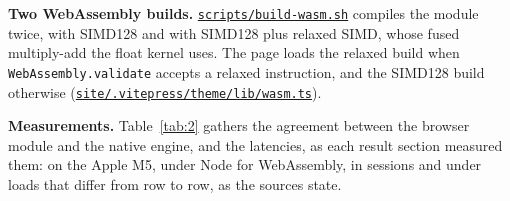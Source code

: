 \documentclass[10pt]{article}
\begin{document}
\textbf{Two WebAssembly builds.} \href{https://github.com/maxgfr/skycmd/blob/main/scripts/build-wasm.sh}{\texttt{scripts/\allowbreak{}build-wasm.sh}} compiles the module twice, with SIMD128 and with SIMD128 plus relaxed SIMD, whose fused multiply-add the float kernel uses. The page loads the relaxed build when \texttt{WebAssembly.validate} accepts a relaxed instruction, and the SIMD128 build otherwise (\href{https://github.com/maxgfr/skycmd/blob/main/site/.vitepress/theme/lib/wasm.ts}{\texttt{site/\allowbreak{}.vitepress/\allowbreak{}theme/\allowbreak{}lib/\allowbreak{}wasm.ts}}).

\textbf{Measurements.} Table~\ref{tab:2} gathers the agreement between the browser module and the native engine, and the latencies, as each result section measured them: on the Apple M5, under Node for WebAssembly, in sessions and under loads that differ from row to row, as the sources state.
\end{document}
